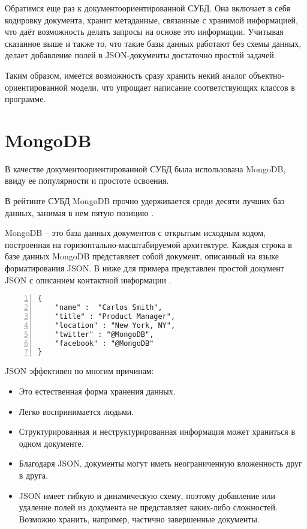 \documentclass[14pt]{extreport}
\begin{document}
Обратимся еще раз к документоориентированной СУБД. Она включает в себя кодировку документа, хранит метаданные, связанные с хранимой информацией, что даёт возможность делать запросы на основе это информации. 
Учитывая сказанное выше и также то, что такие базы данных работают без схемы данных, делает добавление полей в JSON-документы достаточно простой задачей. 

Таким образом, имеется возможность сразу хранить некий аналог объектно-ориентированной модели, что упрощает написание соответствующих классов в программе.

\section{MongoDB} 
В качестве документоориентированной СУБД была использована MongoDB, ввиду ее популярности и простоте освоения.

В рейтинге СУБД MongoDB прочно удерживается среди десяти лучших баз данных, занимая в нем пятую позицию \cite{dbrating}.


MongoDB -- это база данных документов с открытым исходным кодом, построенная на горизонтально-масштабируемой архитектуре. Каждая строка в базе данных MongoDB представляет собой документ, описанный на языке форматирования JSON.
В ниже для примера представлен простой документ JSON с описанием контактной информации \cite{nosqlMongo}.
\begin{Verbatim}[numbers=left,xleftmargin=5mm,fontsize=\small]
{
	"name" :  "Carlos Smith",
	"title" : "Product Manager",
	"location" : "New York, NY",
	"twitter" : "@MongoDB",
	"facebook" : "@MongoDB"
}
\end{Verbatim}

JSON эффективен по многим причинам:
\begin{itemize}
	\item Это естественная форма хранения данных.
	\item Легко воспринимается людьми.
	\item Структурированная и неструктурированная информация может храниться в одном документе.
    \item Благодаря JSON, документы могут иметь неограниченную вложенность друг в друга.
    \item JSON имеет гибкую и динамическую схему, поэтому добавление или удаление полей из документа не представляет каких-либо сложностей. Возможно хранить, например, частично завершенные документы.
\end{itemize}
\end{document}
